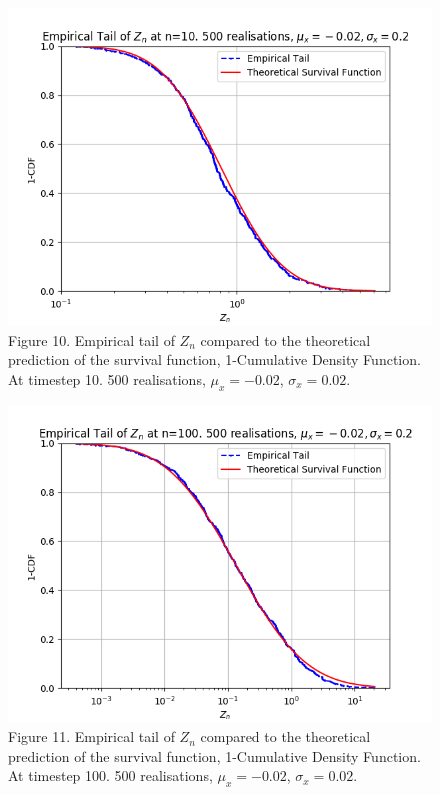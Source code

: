 \documentclass{article}
\begin{document}
\begin{figure}[H]
\includegraphics[scale=0.8]{empirical_tail_10_a.png} 
\small{Figure 10. Empirical tail of $Z_n$ compared to the theoretical prediction of the survival function, 1-Cumulative Density Function. At timestep 10. 500 realisations, $\mu_x=-0.02$, $\sigma_x=0.02$.}
\end{figure}


\begin{figure}[H]
\includegraphics[scale=0.8]{empirical_tail_100_a.png} 
\small{Figure 11. Empirical tail of $Z_n$ compared to the theoretical prediction of the survival function, 1-Cumulative Density Function. At timestep 100. 500 realisations, $\mu_x=-0.02$, $\sigma_x=0.02$.}
\end{figure}
\end{document}
